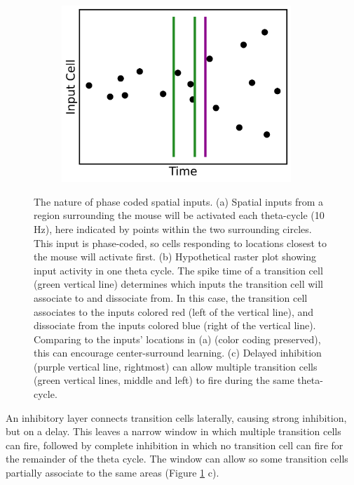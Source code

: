 \documentclass{article}
\begin{document}
\begin{figure}[htbp]
\begin{minipage}[b]{0.38\textwidth}
            
            \begin{subfigure}{\textwidth}
                \subcaption{}
                \includegraphics[width=0.95\textwidth]{input_inhibit_plot.png}
            \end{subfigure}
        \end{minipage}%
        
        \caption{The nature of phase coded spatial inputs. (a) Spatial inputs from a region surrounding the mouse will be activated each theta-cycle (10 Hz), here indicated by points within the two surrounding circles. This input is phase-coded, so cells responding to locations closest to the mouse will activate first. (b) Hypothetical raster plot showing input activity in one theta cycle. The spike time of a transition cell (green vertical line) determines which inputs the transition cell will associate to and dissociate from. In this case, the transition cell associates to the inputs colored red (left of the vertical line), and dissociate from the inputs colored blue (right of the vertical line). Comparing to the inputs' locations in (a) (color coding preserved), this can encourage center-surround learning. (c) Delayed inhibition (purple vertical line, rightmost) can allow multiple transition cells (green vertical lines, middle and left) to fire during the same theta-cycle.}
        
        \label{mouse_plot}
    \end{figure}

    An inhibitory layer connects transition cells laterally, causing strong inhibition, but on a delay. This leaves a narrow window in which multiple transition cells can fire, followed by complete inhibition in which no transition cell can fire for the remainder of the theta cycle. The window can allow so some transition cells partially associate to the same areas (Figure \ref{mouse_plot} c).
\end{document}
